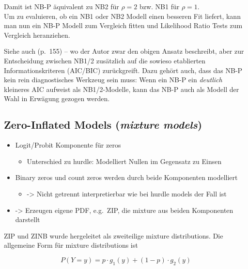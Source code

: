 \documentclass[ngerman,a4paper,]{scrartcl}
\providecommand{\tightlist}{%
  \setlength{\itemsep}{0pt}\setlength{\parskip}{0pt}}
\theoremstyle{definition}
\theoremstyle{definition}
\theoremstyle{definition}
\theoremstyle{remark}
\begin{document}
Damit ist NB-P äquivalent zu NB2 für \(\rho = 2\) bzw. NB1 für \(\rho = 1\).\\
Um zu evaluieren, ob ein NB1 oder NB2 Modell einen besseren Fit liefert, kann man nun ein NB-P Modell zum Vergleich fitten und Likelihood Ratio Tests zum Vergleich heranziehen.

Siehe auch \citet{hilbeModelingCountData2014} (p.~155) -- wo der Autor zwar den obigen Ansatz beschreibt, aber zur Entscheidung zwischen NB1/2 zusätzlich auf die sowieso etablierten Informationskriteren (AIC/BIC) zurückgreift. Dazu gehört auch, dass das NB-P kein rein diagnostisches Werkzeug sein muss: Wenn ein NB-P ein \emph{deutlich} kleineres AIC aufweist als NB1/2-Modelle, kann das NB-P auch als Modell der Wahl in Erwägung gezogen werden.

\hypertarget{mod-zi}{%
\subsection{\texorpdfstring{Zero-Inflated Models (\emph{mixture models})}{Zero-Inflated Models (mixture models)}}\label{mod-zi}}

\begin{itemize}
\tightlist
\item
  Logit/Probit Komponente für zeros

  \begin{itemize}
  \tightlist
  \item
    Unterschied zu hurdle: Modelliert Nullen im Gegensatz zu Einsen
  \end{itemize}
\item
  Binary zeros und count zeros werden durch beide Komponenten modelliert

  \begin{itemize}
  \tightlist
  \item
    -\textgreater{} Nicht getrennt interpretierbar wie bei hurdle models der Fall ist
  \end{itemize}
\item
  -\textgreater{} Erzeugen eigene PDF, e.g.~ZIP, die mixture aus beiden Komponenten darstellt
\end{itemize}

ZIP und ZINB wurde hergeleitet als zweiteilige mixture distributions. Die allgemeine Form für mixture distributions ist

\begin{equation*}
  P(Y = y) = p \cdot g_1(y) + (1-p) \cdot g_2(y)
\end{equation*}
\end{document}
